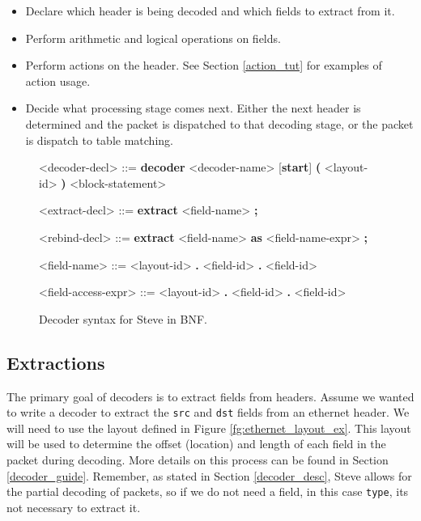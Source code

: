\begin{itemize}
\item Declare which header is being decoded and which fields to extract from it.
\item Perform arithmetic and logical operations on fields.
\item Perform actions on the header. See Section \ref{action_tut} for examples of action usage.
\item Decide what processing stage comes next. Either the next header is determined and the packet is dispatched to that decoding stage, or the packet is dispatch to table matching.
\end{itemize}

\begin{figure}
\begin{mdframed}
\begin{grammar}

<decoder-decl> ::=
\textbf{decoder} <decoder-name> [\textbf{start}] 
\textbf{(} <layout-id> \textbf{)}
<block-statement>

<extract-decl> ::=
\textbf{extract} <field-name> \textbf{;}

<rebind-decl> ::=
\textbf{extract} <field-name> \textbf{as} <field-name-expr> \textbf{;}

<field-name> ::=
<layout-id> \textbf{.} <field-id>
 \textbf{.} <field-id>

<field-access-expr> ::=
<layout-id> \textbf{.} <field-id>
 \textbf{.} <field-id>

\end{grammar}
\end{mdframed}
\caption{Decoder syntax for Steve in BNF.}
\label{fg:decoder_syntax}
\end{figure}

\subsection{Extractions} \label{decoder_extract_tut}

The primary goal of decoders is to extract fields from headers. Assume we wanted to write a decoder to extract the \texttt{src} and \texttt{dst} fields from an ethernet header. We will need to use the layout defined in Figure \ref{fg:ethernet_layout_ex}. This layout will be used to determine the offset (location) and length of each field in the packet during decoding. More details on this process can be found in Section \ref{decoder_guide}. Remember, as stated in Section \ref{decoder_desc}, Steve allows for the partial decoding of packets, so if we do not need a field, in this case \texttt{type}, its not necessary to extract it.

